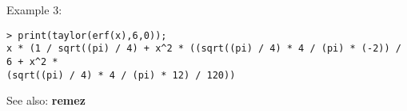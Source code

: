 \noindent Example 3: 
\begin{center}\begin{minipage}{15cm}\begin{Verbatim}[frame=single]
> print(taylor(erf(x),6,0));
x * (1 / sqrt((pi) / 4) + x^2 * ((sqrt((pi) / 4) * 4 / (pi) * (-2)) / 6 + x^2 * 
(sqrt((pi) / 4) * 4 / (pi) * 12) / 120))
\end{Verbatim}
\end{minipage}\end{center}
See also: \textbf{remez}
